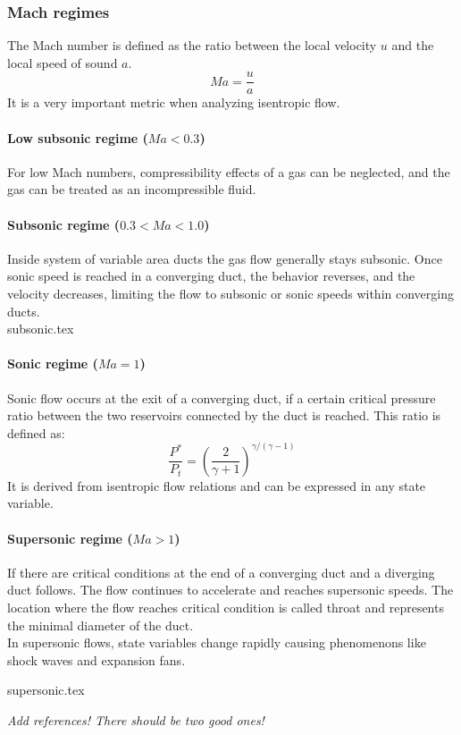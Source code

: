 \subsubsection{Mach regimes}

	The Mach number is defined as the ratio between the local velocity $u$ and the local speed of sound $a$.
	$$
		Ma = \frac{u}{a}
	$$
	It is a very important metric when analyzing isentropic flow.

\paragraph{Low subsonic regime (\(Ma < 0.3\))}

	For low Mach numbers, compressibility effects of a gas can be neglected, and the gas can be treated as an incompressible fluid.

\paragraph{Subsonic regime (\(0.3 < Ma < 1.0\))} 

	Inside system of variable area ducts the gas flow generally stays subsonic.
	Once sonic speed is reached in a converging duct, the behavior reverses, and the velocity decreases, limiting the flow to subsonic or sonic speeds within converging ducts.\\
	
	{subsonic.tex}	
\paragraph{Sonic regime (\(Ma = 1\))}
	
	Sonic flow occurs at the exit of a converging duct, if a certain critical pressure ratio between the two reservoirs connected by the duct is reached.
	This ratio is defined as:
	$$
		\frac{P^*}{P_t}=\left(\frac{2}{\gamma + 1}\right)^{\gamma/(\gamma - 1)}
	$$ 
	It is derived from isentropic flow relations and can be expressed in any state variable.
\paragraph{Supersonic regime (\(Ma > 1\))} 

	If there are critical conditions at the end of a converging duct and a diverging duct follows.
	The flow continues to accelerate and reaches supersonic speeds.
	The location where the flow reaches critical condition is called throat and represents the minimal diameter of the duct.\\
	In supersonic flows, state variables change rapidly causing phenomenons like shock waves and expansion fans.
	
	{supersonic.tex}

{\color{greenColor}\itshape
	Add references! There should be two good ones!
}
